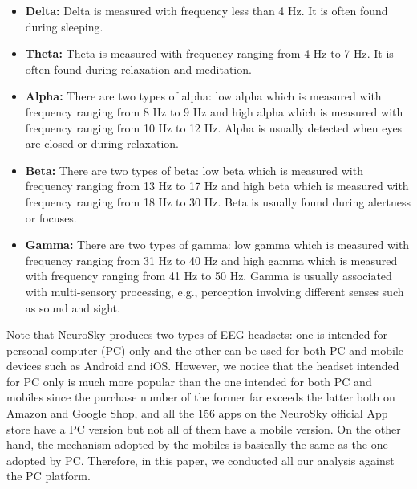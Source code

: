 \begin{itemize}
  \item \textbf{Delta:} Delta is measured with frequency less than 4 Hz. It is often found during sleeping.
  
  \item \textbf{Theta:} Theta is measured with frequency ranging from 4 Hz to 7 Hz. It is often found during relaxation and meditation.
  
  \item \textbf{Alpha:} There are two types of alpha: low alpha which is measured with frequency ranging from 8 Hz to 9 Hz and high alpha which is measured with frequency ranging from 10 Hz to 12 Hz. Alpha is usually detected when eyes are closed or during relaxation.
  
  \item \textbf{Beta:} There are two types of beta: low beta which is measured with frequency ranging from 13 Hz to 17 Hz and high beta which is measured with frequency ranging from 18 Hz to 30 Hz. Beta is usually found during alertness or focuses. 
  
  \item \textbf{Gamma:} There are two types of gamma: low gamma which is measured with frequency ranging from 31 Hz to 40 Hz and high gamma which is measured with frequency ranging from 41 Hz to 50 Hz. Gamma is usually associated with multi-sensory processing, e.g., perception involving different senses such as sound and sight. 
\end{itemize}

Note that NeuroSky produces two types of EEG headsets: one is intended for personal computer (PC) only and the other can be used for both PC and mobile devices such as Android and iOS. However, we notice that the headset intended for PC only is much more popular than the one intended for both PC and mobiles since the purchase number of the former far exceeds the latter both on Amazon and Google Shop, and all the 156 apps on the NeuroSky official App store have a PC version but not all of them have a mobile version. On the other hand, the mechanism adopted by the mobiles is basically the same as the one adopted by PC. Therefore, in this paper, we conducted all our analysis against the PC platform.
  
